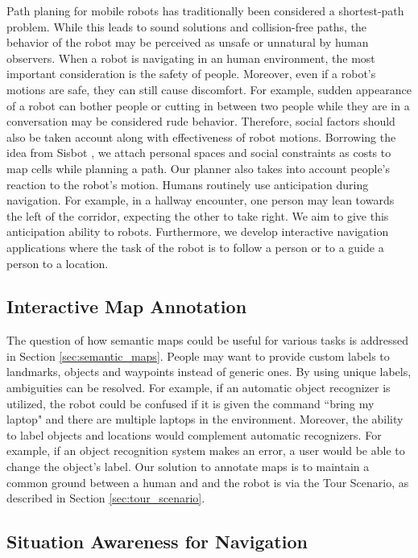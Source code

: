 Path planing for mobile robots has traditionally been considered a shortest-path problem. While this leads to sound solutions and collision-free paths, the behavior of the robot may be perceived as unsafe or unnatural by human observers. When a robot is navigating in an human environment, the most important consideration is the safety of people. Moreover, even if a robot's motions are safe, they can still cause discomfort. For example, sudden appearance of a robot can bother people or cutting in between two people while they are in a conversation may be considered rude behavior. Therefore, social factors should also be taken account along with effectiveness of robot motions. Borrowing the idea from Sisbot \cite{sisbot2007human}, we attach personal spaces and social constraints as costs to map cells while planning a path. Our planner also takes into account people's reaction to the robot's motion. Humans routinely use anticipation during navigation. For example, in a hallway encounter, one person may lean towards the left of the corridor, expecting the other to take right. We aim to give this anticipation ability to robots. Furthermore, we develop interactive navigation applications where the task of the robot is to follow a person or to a guide a person to a location.

\subsection{Interactive Map Annotation}

The question of how semantic maps could be useful for various tasks is addressed in Section \ref{sec:semantic_maps}. People may want to provide custom labels to landmarks, objects and waypoints instead of generic ones. By using unique labels, ambiguities can be resolved. For example, if an automatic object recognizer is utilized, the robot could be confused if it is given the command ``bring my laptop" and there are multiple laptops in the environment. Moreover, the ability to label objects and locations would complement automatic recognizers. For example, if an object recognition system makes an error, a user would be able to change the object's label. Our solution to annotate maps is to maintain a common ground between a human and and the robot is via the Tour Scenario, as described in Section \ref{sec:tour_scenario}.

\subsection{Situation Awareness for Navigation}

